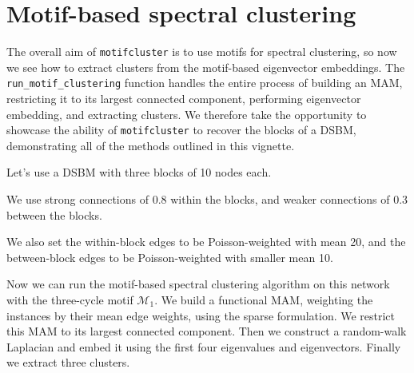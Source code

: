 \documentclass{article}
\begin{document}
\section{Motif-based spectral clustering}

The overall aim of \texttt{motifcluster} is to use motifs for spectral clustering,
so now we see how to extract clusters from the motif-based
eigenvector embeddings.
The \texttt{run\_motif\_clustering} function handles the entire process of
building an MAM, restricting it to its largest connected component,
performing eigenvector embedding, and extracting clusters.
We therefore take the opportunity to showcase the ability of
\texttt{motifcluster} to recover the blocks of a DSBM,
demonstrating all of the methods outlined in this vignette.

Let's use a DSBM with three blocks of 10 nodes each.

\begin{pyconsole}
\end{pyconsole}

We use strong connections of 0.8 within the blocks,
and weaker connections of 0.3 between the blocks.

\begin{pyconsole}
\end{pyconsole}

We also set the within-block edges to be Poisson-weighted with
mean 20,
and the between-block edges to be Poisson-weighted with smaller
mean 10.

\begin{pyconsole}

\end{pyconsole}

\pagebreak

Now we can run the motif-based spectral clustering algorithm
on this network with the three-cycle motif $\mathcal{M}_1$.
We build a functional MAM,
weighting the instances by their mean edge weights,
using the sparse formulation.
We restrict this MAM to its largest connected component.
Then we construct a random-walk Laplacian and embed it using the
first four eigenvalues and eigenvectors.
Finally we extract three clusters.

\begin{pyconsole}
\end{pyconsole}
\end{document}
